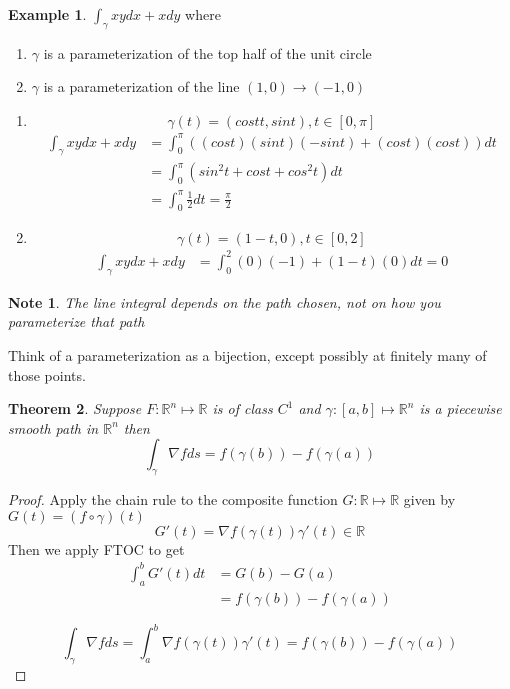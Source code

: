 \documentclass[12pt]{article}
\theoremstyle{plain}
\newtheorem*{note}{Note}
\newtheorem{theorem}{Theorem}[section]
\theoremstyle{definition}
\newtheorem{example}[theorem]{Example}
\begin{document}
\begin{example}
	$\int_\gamma xy dx + xdy$ where
	\begin{enumerate}
		\item{$\gamma$ is a parameterization of the top half of the unit circle}
		\item{$\gamma$ is a parameterization of the line $(1,0) \to (-1,0)$}
	\end{enumerate}
	
	\begin{enumerate}
	\item{
		$$\gamma (t) = (cost t, sin t), t \in [0,\pi]$$
		\begin{align*}
			\int_\gamma xy dx + xdy &= \int^\pi_0 ((cost)(sint)(-sint) + (cost)(cost))dt\\
			&= \int^\pi_0 (sin^2 t + cost + cos^2 t) dt\\
			&= \int^\pi_0 \frac{1}{2} dt = \frac{\pi}{2}
		\end{align*}

	}
	\item{
	$$\gamma (t) = (1-t,0), t\in [0,2]$$
		\begin{align*}
			\int_\gamma xy dx + xdy &= \int^2_0 (0)(-1) + (1-t)(0)dt = 0
		\end{align*}

	}
	\end{enumerate}
\end{example}

\begin{note}
	The line integral depends on the path chosen, not on how you parameterize that path
\end{note}

Think of a parameterization as a bijection, except possibly at finitely many of those points.

\begin{theorem}
	Suppose $F:\mathbb{R}^n \mapsto \mathbb{R}$ is of class $C^1$ and $\gamma: [a,b] \mapsto \mathbb{R}^n$ is a piecewise smooth path in $\mathbb{R}^n$ then
	$$\int_\gamma \nabla f ds = f(\gamma(b)) - f(\gamma(a))$$
\end{theorem}

\begin{proof}
	Apply the chain rule to the composite function $G:\mathbb{R} \mapsto \mathbb{R}$ given by $G(t) = (f \circ \gamma)(t)$
	$$G'(t) = \nabla f(\gamma(t)) \gamma '(t) \in \mathbb{R}$$
	Then we apply FTOC to get
	\begin{align*}
		\int^b_a G'(t) dt &= G(b) - G(a)\\
		&= f(\gamma(b)) - f(\gamma(a))
	\end{align*}
	
	$$\int_\gamma \nabla f ds = \int^b_a \nabla f(\gamma(t)) \gamma '(t) = f(\gamma(b)) - f(\gamma(a))$$

\end{proof}
\end{document}
